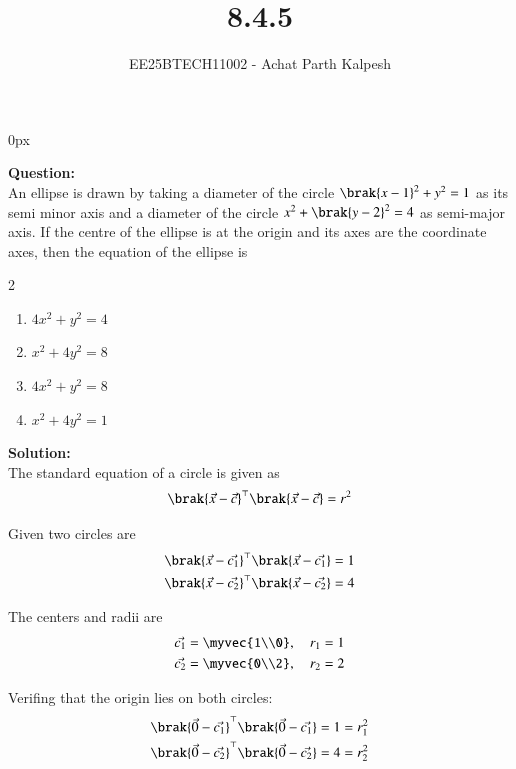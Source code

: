 \documentclass[journal]{IEEEtran}
\begin{document}

\title{8.4.5}
\author{EE25BTECH11002 - Achat Parth Kalpesh }
{\let\newpage\relax\maketitle}
\renewcommand{\thefigure}{\theenumi}
\renewcommand{\thetable}{\theenumi}
\setlength{\intextsep}{10pt} %
\renewcommand{\thetable}{\theenumi}
\parindent 0px



\textbf{Question:}\\
An ellipse is drawn by taking a diameter of the circle $\brak{x-1}^2+y^2=1$ as its semi minor axis and a diameter of the circle $x^2+\brak{y-2}^2=4$ as semi-major axis. If the centre of the ellipse is at the origin and its axes are the coordinate axes, then the equation of the ellipse is 
\begin{multicols}{2}
\begin{enumerate}
    \item $4x^2+y^2=4$ 
    \item $x^2+4y^2=8$
    \item $4x^2+y^2=8$
    \item $x^2+4y^2=1$
\end{enumerate}
\end{multicols}

\textbf{Solution:}\\
The standard equation of a circle is given as
\begin{align}
    \brak{\vec{x}-\vec{c}}^\top\brak{\vec{x}-\vec{c}} = r^2
\end{align}

Given two circles are
\begin{align}
    \brak{\vec{x}-\vec{c_1}}^\top\brak{\vec{x}-\vec{c_1}} = 1\\
    \brak{\vec{x}-\vec{c_2}}^\top\brak{\vec{x}-\vec{c_2}} = 4
\end{align}

The centers and radii are
\begin{align}
    \vec{c_1} = \myvec{1\\0}, \quad r_1 = 1\\
    \vec{c_2} = \myvec{0\\2}, \quad r_2 = 2
\end{align}

Verifing that the origin lies on both circles:
\begin{align}
    \brak{\vec{0}-\vec{c_1}}^\top\brak{\vec{0}-\vec{c_1}} = 1 = r_1^2\\
    \brak{\vec{0}-\vec{c_2}}^\top\brak{\vec{0}-\vec{c_2}} = 4 = r_2^2
\end{align}
\end{document}
